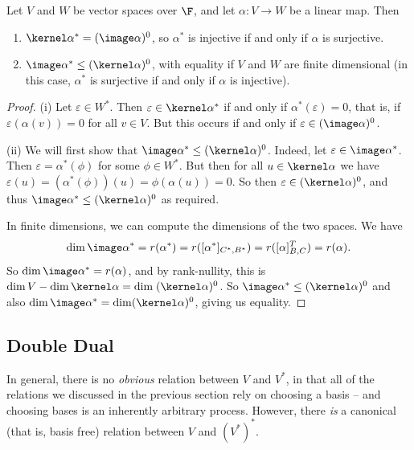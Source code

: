 \begin{proposition}
    Let $V$ and $W$ be vector spaces over $\F$, and let $\alpha: V \rightarrow W$ be a linear map. Then
    \begin{enumerate}[label=(\roman*)]
        \item $\kernel \alpha^* = (\image \alpha)^0$, so $\alpha^*$ is injective if and only if $\alpha$ is surjective.
        \item $\image \alpha^* \leq (\kernel \alpha)^0$, with equality if $V$ and $W$ are finite dimensional (in this case, $\alpha^*$ is surjective if and only if $\alpha$ is injective).
    \end{enumerate}
\end{proposition}
\begin{proof}
    (i) Let $\varepsilon \in W^*$. Then $\varepsilon \in \kernel \alpha^*$ if and only if $\alpha^*(\varepsilon) = 0$, that is, if $\varepsilon(\alpha(v)) = 0$ for all $v \in V$. But this occurs if and only if $\varepsilon \in (\image \alpha)^0$.

    (ii) We will first show that $\image \alpha^* \leq (\kernel \alpha)^0$. Indeed, let $\varepsilon \in \image \alpha^*$. Then $\varepsilon = \alpha^*(\phi)$ for some $\phi \in W^*$. But then for all $u \in \kernel \alpha$ we have $\varepsilon (u) = (\alpha^*(\phi))(u) = \phi(\alpha(u)) = 0$. So then $\varepsilon \in (\kernel \alpha)^0$, and thus $\image \alpha^* \leq (\kernel \alpha)^0$ as required. 

    In finite dimensions, we can compute the dimensions of the two spaces. We have
    $$
    \dim \image \alpha^* = r(\alpha^*) = r([\alpha^*]_{C^*, B^*}) = r([\alpha]^T_{B, C}) = r(\alpha).
    $$
    So $\dim \image \alpha^* = r(\alpha)$, and by rank-nullity, this is $\dim V - \dim \kernel \alpha = \dim \; (\kernel \alpha)^0$. So $\image \alpha^* \leq (\kernel \alpha)^0$ and also $\dim \image \alpha^* = \dim (\kernel \alpha)^0$,  giving us equality.
\end{proof}

\subsection{Double Dual}

In general, there is no \emph{obvious} relation between $V$ and $V^*$, in that all of the relations we discussed in the previous section rely on choosing a basis -- and choosing bases is an inherently arbitrary process. However, there \emph{is} a canonical (that is, basis free) relation between $V$ and $(V^*)^*$.

